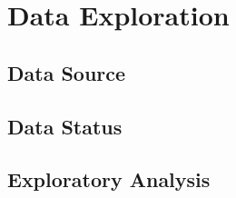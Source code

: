 \chapter{Data Exploration}
\label{chap:Data Exploration}

\section{Data Source}
\label{sec:Data Source}

\section{Data Status}
\label{sec:Data Status}

\section{Exploratory Analysis}
\label{sec:Exploratory Analysis}
